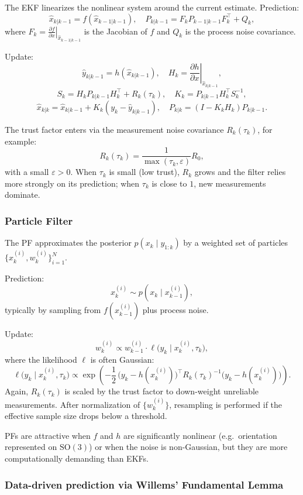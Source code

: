 The EKF linearizes the nonlinear system around the current estimate. Prediction:
\[
\hat{x}_{k|k-1} = f(\hat{x}_{k-1|k-1}), \quad
P_{k|k-1} = F_k P_{k-1|k-1} F_k^\top + Q_k,
\]
where $F_k = \left.\frac{\partial f}{\partial x}\right|_{\hat{x}_{k-1|k-1}}$ is the Jacobian of $f$ and $Q_k$ is the process noise covariance.

Update:
\[
\hat{y}_{k|k-1} = h(\hat{x}_{k|k-1}), \quad
H_k = \left.\frac{\partial h}{\partial x}\right|_{\hat{x}_{k|k-1}},
\]
\[
S_k = H_k P_{k|k-1} H_k^\top + R_k(\tau_k),
\quad
K_k = P_{k|k-1} H_k^\top S_k^{-1},
\]
\[
\hat{x}_{k|k} = \hat{x}_{k|k-1} + K_k (y_k - \hat{y}_{k|k-1}), \quad
P_{k|k} = (I - K_k H_k) P_{k|k-1}.
\]

The trust factor enters via the measurement noise covariance $R_k(\tau_k)$, for example:
\[
R_k(\tau_k) = \frac{1}{\max(\tau_k,\varepsilon)} R_0,
\]
with a small $\varepsilon > 0$. When $\tau_k$ is small (low trust), $R_k$ grows and the filter relies more strongly on its prediction; when $\tau_k$ is close to $1$, new measurements dominate.

\subsubsection*{Particle Filter}

The PF approximates the posterior $p(x_k \mid y_{1:k})$ by a weighted set of particles $\{x_k^{(i)}, w_k^{(i)}\}_{i=1}^N$.

Prediction:
\[
x_k^{(i)} \sim p(x_k \mid x_{k-1}^{(i)}),
\]
typically by sampling from $f(x_{k-1}^{(i)})$ plus process noise.

Update:
\[
w_k^{(i)} \propto w_{k-1}^{(i)} \cdot \ell\bigl(y_k \mid x_k^{(i)}, \tau_k\bigr),
\]
where the likelihood $\ell$ is often Gaussian:
\[
\ell\bigl(y_k \mid x_k^{(i)}, \tau_k\bigr)
\propto
\exp\!\left(
-\frac{1}{2}\, \bigl(y_k - h(x_k^{(i)})\bigr)^\top R_k(\tau_k)^{-1} \bigl(y_k - h(x_k^{(i)})\bigr)
\right).
\]
Again, $R_k(\tau_k)$ is scaled by the trust factor to down-weight unreliable measurements. After normalization of $\{w_k^{(i)}\}$, resampling is performed if the effective sample size drops below a threshold.

PFs are attractive when $f$ and $h$ are significantly nonlinear (e.g.\ orientation represented on $\mathrm{SO}(3)$) or when the noise is non-Gaussian, but they are more computationally demanding than EKFs.

\subsubsection*{Data-driven prediction via Willems’ Fundamental Lemma}

